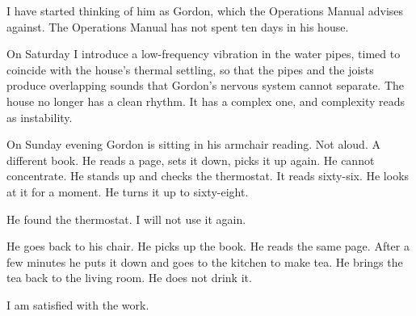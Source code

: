 I have started thinking of him as Gordon, which the Operations Manual advises against. The Operations Manual has not spent ten days in his house.

On Saturday I introduce a low-frequency vibration in the water pipes, timed to coincide with the house's thermal settling, so that the pipes and the joists produce overlapping sounds that Gordon's nervous system cannot separate. The house no longer has a clean rhythm. It has a complex one, and complexity reads as instability.

On Sunday evening Gordon is sitting in his armchair reading. Not aloud. A different book. He reads a page, sets it down, picks it up again. He cannot concentrate. He stands up and checks the thermostat. It reads sixty-six. He looks at it for a moment. He turns it up to sixty-eight.

He found the thermostat. I will not use it again.

He goes back to his chair. He picks up the book. He reads the same page. After a few minutes he puts it down and goes to the kitchen to make tea. He brings the tea back to the living room. He does not drink it.

I am satisfied with the work.
